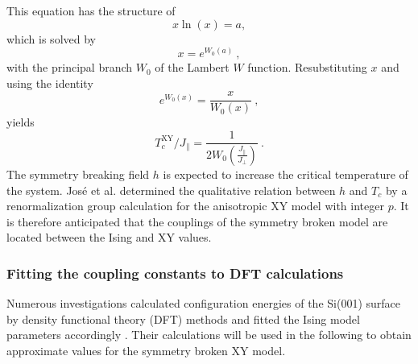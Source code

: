 	This equation has the structure of
	\begin{equation}
		x \ln (x) =	a,
	\end{equation}
	which is solved by
	\begin{equation}
		x =	e^{W_0 (a)}~,
	\end{equation}
	with the principal branch $W_0$ of the Lambert $W$ function. Resubstituting $x$ and using the identity
	\begin{equation}
		e^{W_0(x)} =	\frac{x}{W_0(x)} ~,
	\end{equation} 
	yields
	\begin{equation} \label{Eq::XY-crit-general-effective}
		{T^{\text{XY}}_c} /	{J_\parallel} =	\frac{1}{2 W_0 \left(\frac{J_\parallel}{J_\perp}\right)}~.
	\end{equation}
 	The symmetry breaking field $h$ is expected to increase the critical temperature of the system. José et al. \cite{jose1977renormalization} determined the qualitative relation between $h$ and $T_c$ by a renormalization group calculation for the anisotropic XY model with integer $p$. It is therefore anticipated that the couplings of the symmetry broken model are located between the Ising and XY values.
	
	\subsubsection{Fitting the coupling constants to DFT calculations}
	Numerous investigations calculated configuration energies of the Si(001) \cite{fu2001molecular, ramstad1995theoretical} surface by density functional theory (DFT) methods and fitted the Ising model parameters accordingly \cite{pillay2004revisit, inoue1994order, ihm1983structural, xiao2019spontaneous}. Their calculations will be used in the following to obtain approximate values for the symmetry broken XY model.  \\
	
